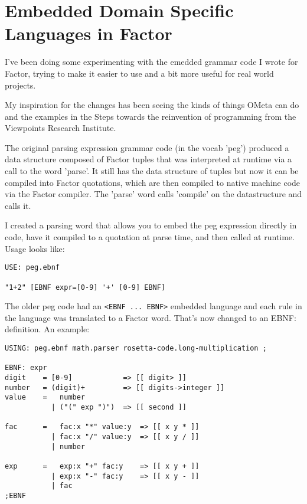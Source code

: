 \chapter{Embedded Domain Specific Languages in Factor}\label{pegsebnf}

I've been doing some experimenting with the emedded grammar code I
wrote for Factor, trying to make it easier to use and a bit more
useful for real world projects.

My inspiration for the changes has been seeing the kinds of things
OMeta can do and the examples in the Steps towards the reinvention of
programming from the Viewpoints Research Institute.

The original parsing expression grammar code (in the vocab 'peg')
produced a data structure composed of Factor tuples that was
interpreted at runtime via a call to the word 'parse'. It still has
the data structure of tuples but now it can be compiled into Factor
quotations, which are then compiled to native machine code via the
Factor compiler. The 'parse' word calls 'compile' on the datastructure
and calls it.

I created a parsing word that allows you to embed the peg expression
directly in code, have it compiled to a quotation at parse time, and
then called at runtime. Usage looks like:

\begin{verbatim}
USE: peg.ebnf

"1+2" [EBNF expr=[0-9] '+' [0-9] EBNF]
\end{verbatim}

The older peg code had an \texttt{<EBNF ... EBNF>} embedded language and each
rule in the language was translated to a Factor word. That's now
changed to an EBNF: definition. An example:

\begin{verbatim}
USING: peg.ebnf math.parser rosetta-code.long-multiplication ;

EBNF: expr 
digit    = [0-9]            => [[ digit> ]]
number   = (digit)+         => [[ digits->integer ]]
value    =   number 
           | ("(" exp ")")  => [[ second ]]

fac      =   fac:x "*" value:y  => [[ x y * ]]
           | fac:x "/" value:y  => [[ x y / ]]
           | number

exp      =   exp:x "+" fac:y    => [[ x y + ]]
           | exp:x "-" fac:y    => [[ x y - ]]
           | fac
;EBNF
\end{verbatim}

